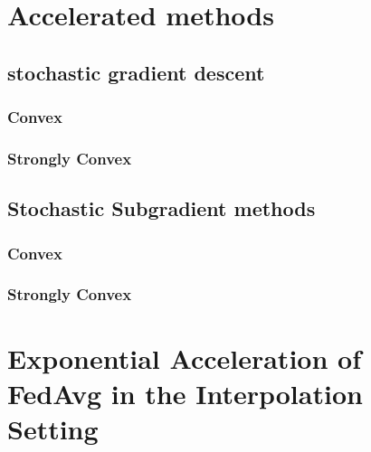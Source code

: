 \section{Accelerated methods}
\subsection{stochastic gradient descent}
\subsubsection{Convex}
\label{sec:nasgdcvxsmth}


\subsubsection{Strongly Convex}
\label{sec:nasgdscvxsmth}


\subsection{Stochastic Subgradient methods}

\subsubsection{Convex}
\label{sec:nasgdcvxnonsmth}


\subsubsection{Strongly Convex}
\label{sec:nasgdscvxnonsmth}


\section{Exponential Acceleration of FedAvg in the Interpolation Setting}
\label{sec:interpolation}








